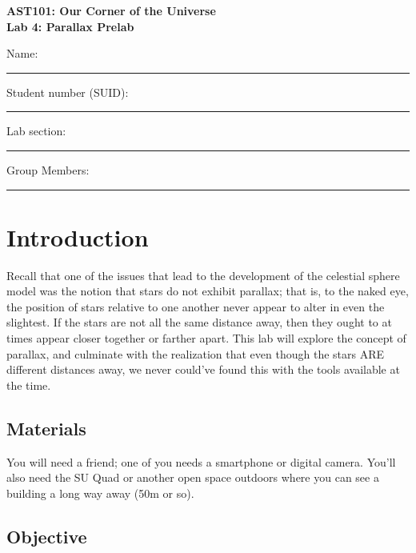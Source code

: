 \documentclass[11pt]{article}
\begin{document}
\begin{center}
\textbf{\Large
AST101: Our Corner of the Universe \\
\vspace*{0.1cm}
Lab 4: Parallax Prelab
}
\end{center}

\vspace*{0.5cm}

{\Large Name:}\vspace*{0.5cm}\\\hrule
{\Large Student number (SUID):}\vspace*{0.5cm}\\\hrule
{\Large Lab section:}\vspace*{0.5cm}\\\hrule
{\Large Group Members:}\vspace*{0.5cm}\\\hrule
\vspace*{0.5cm}

\section{Introduction}

Recall that one of the issues that lead to the development of the celestial sphere model was the notion that stars do not exhibit parallax; that is, to the naked eye, the position of stars relative to one another never appear to alter in even the slightest. If the stars are not all the same distance away, then they ought to at times appear closer together or farther apart. This lab will explore the concept of parallax, and culminate with the realization that even though the stars ARE different distances away, we never could've found this with the tools available at the time. 

\subsection*{Materials}

You will need a friend; one of you needs a smartphone or digital camera. You'll also need the SU Quad or another open space outdoors where you can see a building a long way away (50m or so).

\subsection*{Objective}
\end{document}
